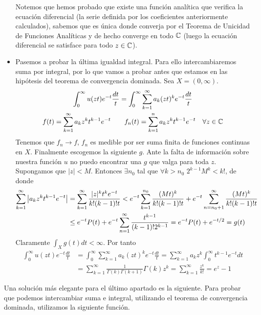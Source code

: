 \documentclass[twoside]{article}
\begin{document}
\begin{ejercicio}{6}
\begin{solucion}
\begin{itemize}
Notemos que hemos probado que existe una función analítica que verifica la ecuación diferencial (la serie definida por los coeficientes anteriormente calculados), sabemos que es única donde converja por el Teorema de Unicidad de Funciones Analíticas y de hecho converge en todo $\mathbb{C}$ (luego la ecuación diferencial se satisface para todo $z\in \mathbb{C}$). 
\item Pasemos a probar la última igualdad integral. Para ello intercambiaremos suma por integral, por lo que vamos a probar antes que estamos en las hipótesis del teorema de convergencia dominada. Sea $X=(0,\infty)$.
\begin{gather*}
\int_0^\infty u(zt)e^{-t}\frac{dt}{t} = \int_0^\infty \sum_{k=1}^\infty a_k (zt)^k e^{-t}\frac{dt}{t}\\
f(t)=\sum_{k=1}^\infty a_kz^kt^{k-1}e^{-t}  \qquad f_n(t) = \sum_{k=1}^n a_kz^kt^{k-1}e^{-t} \quad \forall z\in \mathbb{C}
\end{gather*}
Tenemos que $f_n \to f$, $f_n$ es medible por ser suma finita de funciones continuas en $X$. Finalmente escogemos la siguiente $g$. Ante la falta de información sobre nuestra función $u$ no puedo encontrar una $g$ que valga para toda $z$. Supongamos que $|z|<M$. Entonces $\exists n_0$ tal que $\forall k>n_0$ $2^{k-1} M^k<k!$, de donde
\begin{align*}
\sum_{k=1}^\infty \left\lvert a_kz^kt^{k-1}e^{-t}\right\rvert &= \sum_{k=1}^\infty  \frac{|z|^kt^{k}e^{-t}}{k!(k-1)!t} < e^{-t}\sum_{k=1}^{n_0} \frac{(Mt)^k}{k!(k-1)!t} + e^{-t}\sum_{n=n_0+1}^\infty \frac{(Mt)^k}{k!(k-1)!t}\\
&\leq e^{-t}P(t) + e^{-t}\sum_{n=1}^\infty \frac{t^{k-1}}{(k-1)!2^{k-1}} = e^{-t}P(t)+e^{-t/2} =g(t)
\end{align*}
Claramente $\int_X g(t)dt < \infty$. Por tanto
\begin{align*}
\int_0^\infty u(zt)e^{-t}\frac{dt}{t} & = \int_0^\infty \sum_{k=1}^\infty a_k (zt)^k e^{-t}\frac{dt}{t}= \sum_{k=1}^\infty a_k z^k  \int_0^\infty t^{k-1}e^{-t}dt\\
&= \sum_{k=1}^\infty \frac{1}{\Gamma(k)\Gamma(k+1)} \Gamma(k) z^k =  \sum_{k=1}^\infty \frac{z^k}{k!} = e^z -1
\end{align*}
\end{itemize}
\begin{nota}
Una solución más elegante para el último apartado es la siguiente. Para probar que podemos intercambiar suma e integral, utilizando el teorema de convergencia dominada, utilizamos la siguiente función.
\begin{align*}

\end{align*}
\end{nota}
\end{solucion}
\end{ejercicio}
\end{document}
